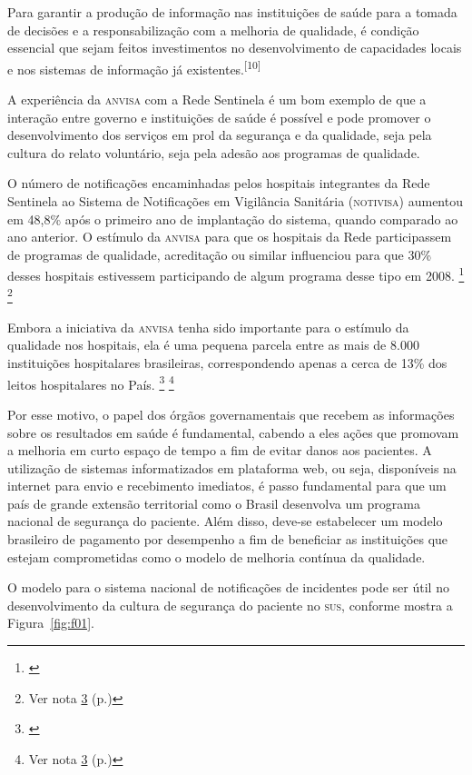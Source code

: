 \documentclass{article}
\newcounter{fn1}
\newcounter{fn2}
\newcounter{fn3}
\newcounter{fn4}
\newcounter{fn5}
\newcounter{fn6}
\newcounter{fn7}
\newcounter{fn8}
\begin{document}
Para garantir a produção de informação nas instituições de saúde para a tomada
de decisões
e a responsabilização com a melhoria de qualidade, é condição essencial que
sejam feitos
investimentos no desenvolvimento de capacidades locais e nos sistemas de
informação já
existentes.\textsuperscript{[}\textsuperscript{10}\textsuperscript{]}

A experiência da \textsc{anvisa} com a Rede Sentinela é um bom exemplo de que a interação
entre
governo e instituições de saúde é possível e pode promover o desenvolvimento dos
serviços em
prol da segurança e da qualidade, seja pela cultura do relato voluntário, seja
pela adesão
aos programas de qualidade.

O número de notificações encaminhadas pelos hospitais integrantes da Rede
Sentinela ao
Sistema de Notificações em Vigilância Sanitária (\textsc{notivisa}) aumentou em 48,8\%
após o primeiro
ano de implantação do sistema, quando comparado ao ano anterior. O estímulo da
\textsc{anvisa} para
que os hospitais da Rede participassem de programas de qualidade, acreditação ou
similar
influenciou para que 30\% desses hospitais estivessem participando de algum
programa desse
tipo em 2008.%
		{\footnote{ \label{ftn:fn3}}}%
		{\footnote{Ver nota \ref{ftn:fn3} (p.\pageref{ftn:fn3})}}

Embora a iniciativa da \textsc{anvisa} tenha sido importante para o estímulo da qualidade
nos
hospitais, ela é uma pequena parcela entre as mais de 8.000 instituições
hospitalares
brasileiras, correspondendo apenas a cerca de 13\% dos leitos hospitalares no
País.%
		{\footnote{ \label{ftn:fn3}}}%
		{\footnote{Ver nota \ref{ftn:fn3} (p.\pageref{ftn:fn3})}}

Por esse motivo, o papel dos órgãos governamentais que recebem as informações
sobre os
resultados em saúde é fundamental, cabendo a eles ações que promovam a melhoria
em curto
espaço de tempo a fim de evitar danos aos pacientes. A utilização de sistemas
informatizados
em plataforma web, ou seja, disponíveis na internet para envio e recebimento
imediatos, é
passo fundamental para que um país de grande extensão territorial como o Brasil
desenvolva
um programa nacional de segurança do paciente. Além disso, deve-se estabelecer
um modelo
brasileiro de pagamento por desempenho a fim de beneficiar as instituições que
estejam
comprometidas como o modelo de melhoria contínua da qualidade.

O modelo para o sistema nacional de notificações de incidentes pode ser útil no
desenvolvimento da cultura de segurança do paciente no \textsc{sus}, conforme mostra a
Figura~\ref{fig:f01}.
\end{document}
